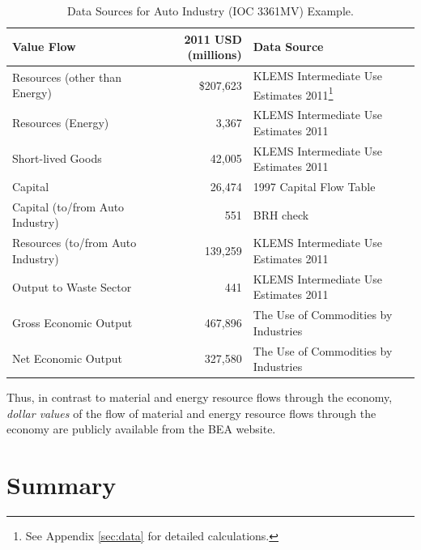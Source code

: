 \begin{table}
\caption[Data Sources for Auto Industry (IOC 3361MV) Example]{Data Sources for Auto Industry (IOC 3361MV) Example.}
\begin{center}
  \begin{tabular}{l @{\hspace{2em}} r @{\hspace{2em}} l}
   \toprule 
    Value Flow & 2011 USD (millions) & Data Source  \\ 
	\midrule
    Resources (other than Energy) & \$207,623            & KLEMS Intermediate Use Estimates 2011\footnote{See Appendix \ref{sec:data} for detailed calculations.} \\
    Resources (Energy) &   3,367&   KLEMS Intermediate Use Estimates 2011                \\
    Short-lived Goods &   42,005 &   KLEMS Intermediate Use Estimates 2011    \\
    Capital &  26,474  &  1997 Capital Flow Table     \\  
    Capital (to/from Auto Industry) &  551 & BRH check      \\
    Resources (to/from Auto Industry) &  139,259 &  KLEMS Intermediate Use Estimates 2011     \\
    Output to Waste Sector & 441  &  KLEMS Intermediate Use Estimates 2011     \\
    Gross Economic Output & 467,896  &  The Use of Commodities by Industries  \\ 
    Net Economic Output & 327,580   &  The Use of Commodities by Industries \\
    \bottomrule
  \end{tabular}

\end{center}
\label{tab:data}
\end{table}

Thus, in contrast to material and energy resource flows through the economy, \emph{dollar values} of the flow of material and energy resource flows through the economy are publicly available from the BEA website. 


\section{Summary}
\label{sec:value_summary}






